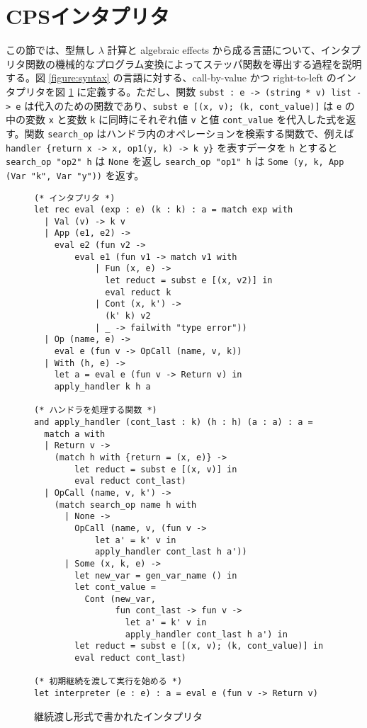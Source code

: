 \section{CPSインタプリタ}
\label{section:definition}

この節では、型無し $\lambda$ 計算と algebraic effects から成る言語について、インタプリタ関数の機械的なプログラム変換によってステッパ関数を導出する過程を説明する。図 \ref{figure:syntax} の言語に対する、call-by-value かつ right-to-left のインタプリタを図 \ref{figure:1cps} に定義する。ただし、関数 \texttt{subst : e -> (string * v) list -> e} は代入のための関数であり、\texttt{subst e [(x, v); (k, cont\_value)]} は \texttt{e} の中の変数 \texttt{x} と変数 \texttt{k} に同時にそれぞれ値 \texttt{v} と値 \texttt{cont\_value} を代入した式を返す。関数 \texttt{search\_op} はハンドラ内のオペレーションを検索する関数で、例えば \texttt{handler \{return x -> x, op1(y, k) -> k y\}} を表すデータを \texttt{h} とすると \texttt{search\_op "op2" h} は \texttt{None} を返し \texttt{search\_op "op1" h} は \texttt{Some (y, k, App (Var "k", Var "y"))} を返す。

\begin{figure}
\begin{verbatim}
(* インタプリタ *)
let rec eval (exp : e) (k : k) : a = match exp with
  | Val (v) -> k v
  | App (e1, e2) ->
    eval e2 (fun v2 ->
        eval e1 (fun v1 -> match v1 with
            | Fun (x, e) ->
              let reduct = subst e [(x, v2)] in
              eval reduct k
            | Cont (x, k') ->
              (k' k) v2
            | _ -> failwith "type error"))
  | Op (name, e) ->
    eval e (fun v -> OpCall (name, v, k))
  | With (h, e) ->
    let a = eval e (fun v -> Return v) in
    apply_handler k h a

(* ハンドラを処理する関数 *)
and apply_handler (cont_last : k) (h : h) (a : a) : a =
  match a with
  | Return v ->
    (match h with {return = (x, e)} ->
        let reduct = subst e [(x, v)] in
        eval reduct cont_last)
  | OpCall (name, v, k') ->
    (match search_op name h with
      | None ->
        OpCall (name, v, (fun v ->
            let a' = k' v in
            apply_handler cont_last h a'))
      | Some (x, k, e) ->
        let new_var = gen_var_name () in
        let cont_value =
          Cont (new_var,
                fun cont_last -> fun v ->
                  let a' = k' v in
                  apply_handler cont_last h a') in
        let reduct = subst e [(x, v); (k, cont_value)] in
        eval reduct cont_last)

(* 初期継続を渡して実行を始める *)
let interpreter (e : e) : a = eval e (fun v -> Return v)
\end{verbatim}
\caption{継続渡し形式で書かれたインタプリタ}
\label{figure:1cps}
\end{figure}

